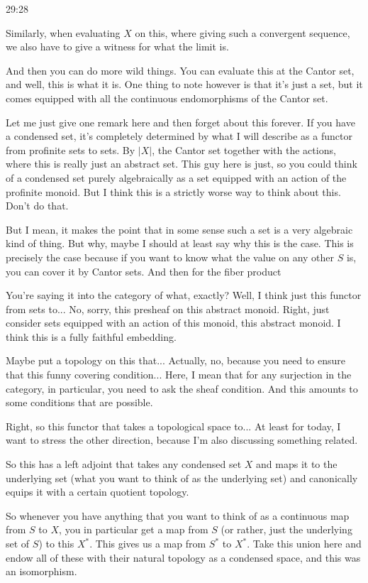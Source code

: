 \begin{example}
\begin{unfinished}{29:28}
\begin{remark}
Similarly, when evaluating $X$ on this, where giving such a convergent sequence, we also have to give a witness for what the limit is.

And then you can do more wild things. You can evaluate this at the Cantor set, and well, this is what it is. One thing to note however is that it's just a set, but it comes equipped with all the continuous endomorphisms of the Cantor set.

\begin{remark}
Let me just give one remark here and then forget about this forever. If you have a condensed set, it's completely determined by what I will describe as a functor from profinite sets to sets. By $|X|$, the Cantor set together with the actions, where this is really just an abstract set. This guy here is just, so you could think of a condensed set purely algebraically as a set equipped with an action of the profinite monoid. But I think this is a strictly worse way to think about this. Don't do that.

But I mean, it makes the point that in some sense such a set is a very algebraic kind of thing. But why, maybe I should at least say why this is the case. This is precisely the case because if you want to know what the value on any other $S$ is, you can cover it by Cantor sets. And then for the fiber product

You're saying it into the category of what, exactly? Well, I think just this functor from sets to... No, sorry, this presheaf on this abstract monoid. Right, just consider sets equipped with an action of this monoid, this abstract monoid. I think this is a fully faithful embedding.

Maybe put a topology on this that... Actually, no, because you need to ensure that this funny covering condition... Here, I mean that for any surjection in the category, in particular, you need to ask the sheaf condition. And this amounts to some conditions that are possible.

\end{remark}

Right, so this functor that takes a topological space to... At least for today, I want to stress the other direction, because I'm also discussing something related.

So this has a left adjoint that takes any condensed set $X$ and maps it to the underlying set (what you want to think of as the underlying set) and canonically equips it with a certain quotient topology.

So whenever you have anything that you want to think of as a continuous map from $S$ to $X$, you in particular get a map from $S$ (or rather, just the underlying set of $S$) to this $X^*$. This gives us a map from $S^*$ to $X^*$. Take this union here and endow all of these with their natural topology as a condensed space, and this was an isomorphism.


\end{remark}
\end{unfinished}
\end{example}
